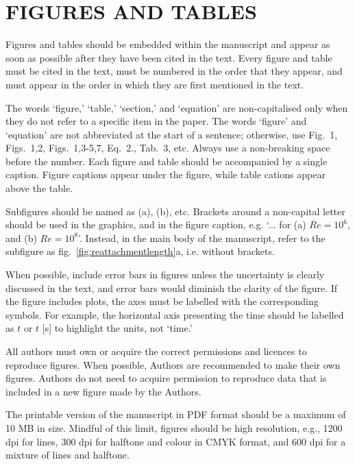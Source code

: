 \documentclass[oneside, a4paper, onecolumn, 11pt]{article}
\begin{document}

\section{FIGURES AND TABLES} \label{sec:figures}

Figures and tables should be embedded within the manuscript and appear as soon as possible after they have been cited in the text. Every figure and table must be cited in the text, must be numbered in the order that they appear, and must appear in the order in which they are first mentioned in the text. 

The words `figure,' `table,' `section,' and `equation' are non-capitalised only when they do not refer to a specific item in the paper. The words `figure' and `equation' are not abbreviated at the start of a sentence; otherwise, use Fig.~1, Figs.~1,2, Figs.~1,3-5,7, Eq.~2., Tab.~3, etc. Always use a non-breaking space before the number. Each figure and table should be accompanied by a single caption. Figure captions appear under the figure, while table cations appear above the table. 

Subfigures should be named as (a), (b), etc. Brackets around a non-capital letter should be used in the graphics, and in the figure caption, e.g. `... for (a) $Re=10^6$, and (b) $Re=10^8$'. Instead, in the main body of the manuscript, refer to the subfigure as fig.~\ref{fig:reattachmentlength}a, i.e. without brackets. 

When possible, include error bars in figures unless the uncertainty is clearly discussed in the text, and error bars would diminish the clarity of the figure. If the figure includes plots, the axes must be labelled with the corresponding symbols. For example, the horizontal axis presenting the time should be labelled as $t$ or $t$ [s] to highlight the units, not `time.' 

All authors must own or acquire the correct permissions and licences to reproduce figures. When possible, Authors are recommended to make their own figures. Authors do not need to acquire permission to reproduce data that is included in a new figure made by the Authors. 

The printable version of the manuscript in PDF format should be a maximum of 10 MB in size. Mindful of this limit, figures should be high resolution, e.g., 1200 dpi for lines, 300 dpi for halftone and colour in CMYK format, and 600 dpi for a mixture of lines and halftone. 
\end{document}
